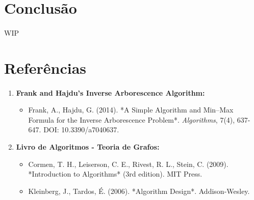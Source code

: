 \documentclass[12pt,a4paper]{article}
\begin{document}
\section{Conclusão}
\paragraph{}
WIP

\section{Referências}
\paragraph{}
\begin{enumerate}
     \item \textbf{Frank and Hajdu's Inverse Arborescence Algorithm:}
    \begin{itemize}
        \item Frank, A., Hajdu, G. (2014). *A Simple Algorithm and Min–Max Formula for the Inverse Arborescence Problem*. \textit{Algorithms}, 7(4), 637-647. DOI: 10.3390/a7040637.
    \end{itemize}
    
    \item \textbf{Livro de Algoritmos - Teoria de Grafos:}
    \begin{itemize}
        \item Cormen, T. H., Leiserson, C. E., Rivest, R. L., Stein, C. (2009). *Introduction to Algorithms* (3rd edition). MIT Press.
        \item Kleinberg, J., Tardos, É. (2006). *Algorithm Design*. Addison-Wesley.
    \end{itemize}
\end{enumerate}

\end{document}
